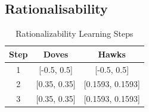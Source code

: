 \documentclass[12pt]{article}
\begin{document}
\subsection{Rationalisability}
\begin{table}[htbp]
    \centering
    \caption{Rationalizability Learning Steps}
    \label{table1}
    \begin{tabular}{|c|c|c|}
    \hline
    \textbf{Step} & \textbf{Doves} & \textbf{Hawks} \\ \hline
    1             & [-0.5, 0.5]      & [-0.5, 0.5]      \\ \hline
    2             & [0.35, 0.35]     & [0.1593, 0.1593]     \\ \hline
    3             & [0.35, 0.35]     & [0.1593, 0.1593]     \\ \hline
    \end{tabular}
    \end{table}
\end{document}
